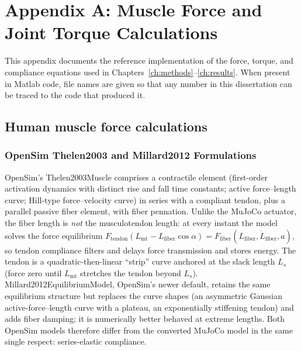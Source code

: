 \chapter{Appendix A: Muscle Force and Joint Torque Calculations}\label{app:muscle_calcs}
\graphicspath{{figs/92-AppendixA/}}

This appendix documents the reference implementation of the force, torque, and compliance equations used in Chapters~\ref{ch:methods}--\ref{ch:results}. When present in Matlab code, file names are given so that any number in this dissertation can be traced to the code that produced it.

\section{Human muscle force calculations}
\subsection{OpenSim Thelen2003 and Millard2012 Formulations}

OpenSim's Thelen2003Muscle comprises a contractile element (first-order
activation dynamics with distinct rise and fall time constants; active
force--length curve; Hill-type force--velocity
curve) in series with a compliant tendon, plus a parallel passive fiber
element, with fiber pennation. Unlike the MuJoCo actuator, the fiber
length is \emph{not} the musculotendon length: at every instant the
model solves the force equilibrium
$F_{\text{tendon}}(L_{\text{mt}} - L_{\text{fiber}}\cos\alpha)
 = F_{\text{fiber}}(L_{\text{fiber}}, \dot{L}_{\text{fiber}}, a)$,
so tendon compliance filters and delays force transmission and stores
energy. The tendon is a quadratic-then-linear ``strip'' curve anchored
at the slack length $L_s$ (force zero until $L_{\text{mt}}$ stretches
the tendon beyond $L_s$). Millard2012EquilibriumModel, OpenSim's newer
default, retains the same equilibrium structure but replaces the curve
shapes (an asymmetric Gaussian active-force--length curve with a
plateau, an exponentially stiffening tendon) and adds fiber damping; it
is numerically better behaved at extreme lengths. Both OpenSim models
therefore differ from the converted MuJoCo model in the same single
respect: series-elastic compliance.

